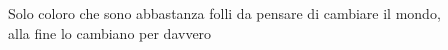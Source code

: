 \documentclass[11pt]{toptesi}
\begin{document}
\frontespizio




\frontmatter

 \begin{flushright}
 \noindent
  
 \end{flushright}
\cleardoublepage


\begin{flushright}
\noindent
Solo coloro che sono abbastanza folli da pensare di cambiare il mondo,\\ alla fine lo cambiano per davvero

\textit{}
\end{flushright}
\cleardoublepage
{}
\begin{flushright}
	\noindent
	\textit{}
\end{flushright}
\cleardoublepage



\end{document}
